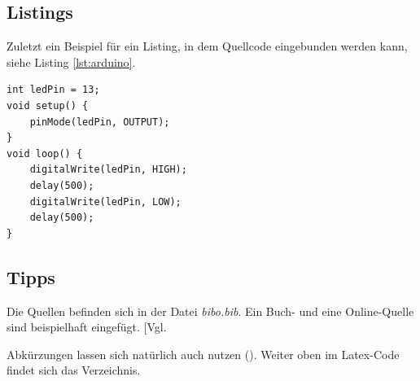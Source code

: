 \documentclass[12pt,a4paper,bibliography=totocnumbered,listof=totocnumbered]{scrartcl}
\begin{document}
\subsection{Listings}
Zuletzt ein Beispiel für ein Listing, in dem Quellcode eingebunden werden kann, siehe Listing \ref{lst:arduino}.

\vspace{1em}
\begin{lstlisting}[caption=Arduino Beispielprogramm, label=lst:arduino]
int ledPin = 13;
void setup() {
    pinMode(ledPin, OUTPUT);
}
void loop() {
    digitalWrite(ledPin, HIGH);
    delay(500);
    digitalWrite(ledPin, LOW);
    delay(500);
}
\end{lstlisting}

\subsection{Tipps}
Die Quellen befinden sich in der Datei \textit{bibo.bib}. Ein Buch- und eine Online-Quelle sind beispielhaft eingefügt. [Vgl. %

Abkürzungen lassen sich natürlich auch nutzen (). Weiter oben im Latex-Code findet sich das Verzeichnis.
\pagebreak
\end{document}
